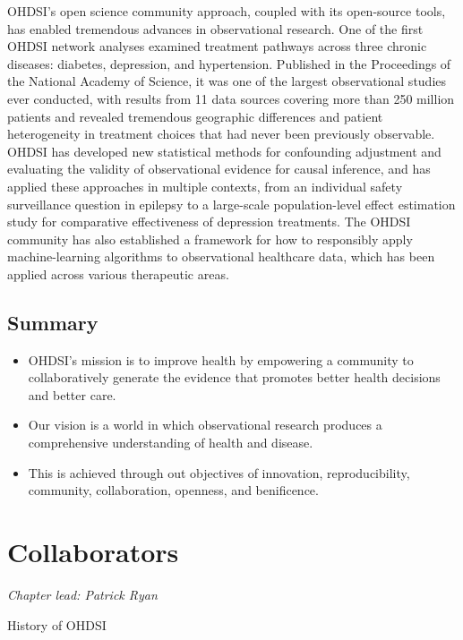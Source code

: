 \documentclass[11pt]{book}
\theoremstyle{definition}
\theoremstyle{definition}
\theoremstyle{definition}
\theoremstyle{remark}
\let\BeginKnitrBlock\begin \let\EndKnitrBlock\end
\begin{document}
OHDSI's open science community approach, coupled with its open-source tools, has enabled tremendous advances in observational research. One of the first OHDSI network analyses examined treatment pathways across three chronic diseases: diabetes, depression, and hypertension. Published in the Proceedings of the National Academy of Science, it was one of the largest observational studies ever conducted, with results from 11 data sources covering more than 250 million patients and revealed tremendous geographic differences and patient heterogeneity in treatment choices that had never been previously observable. OHDSI has developed new statistical methods for confounding adjustment and evaluating the validity of observational evidence for causal inference, and has applied these approaches in multiple contexts, from an individual safety surveillance question in epilepsy to a large-scale population-level effect estimation study for comparative effectiveness of depression treatments. The OHDSI community has also established a framework for how to responsibly apply machine-learning algorithms to observational healthcare data, which has been applied across various therapeutic areas.

\hypertarget{summary}{%
\section{Summary}\label{summary}}

\BeginKnitrBlock{rmdsummary}
\begin{itemize}
\item
  OHDSI's mission is to improve health by empowering a community to collaboratively generate the evidence that promotes better health decisions and better care.
\item
  Our vision is a world in which observational research produces a comprehensive understanding of health and disease.
\item
  This is achieved through out objectives of innovation, reproducibility, community, collaboration, openness, and benificence.
\end{itemize}
\EndKnitrBlock{rmdsummary}

\hypertarget{Collaborators}{%
\chapter{Collaborators}\label{Collaborators}}

\emph{Chapter lead: Patrick Ryan}

History of OHDSI
\end{document}
